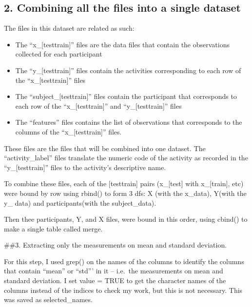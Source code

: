 \documentclass[
]{article}
\providecommand{\tightlist}{%
  \setlength{\itemsep}{0pt}\setlength{\parskip}{0pt}}
\begin{document}
\hypertarget{combining-all-the-files-into-a-single-dataset}{%
\subsection{2. Combining all the files into a single
dataset}\label{combining-all-the-files-into-a-single-dataset}}

The files in this dataset are related as such:

\begin{itemize}
\tightlist
\item
  The ``x\_{[}test\textbar train{]}'' files are the data files that
  contain the observations collected for each participant
\item
  The ``y\_{[}test\textbar train{]}'' files contain the activities
  corresponding to each row of the ``x\_{[}test\textbar train{]}'' files
\item
  The ``subject\_{[}test\textbar train{]}'' files contain the
  participant that corresponds to each row of the
  ``x\_{[}test\textbar train{]}'' and ``y\_{[}test\textbar train{]}''
  files
\item
  The ``features'' files contains the list of observations that
  corresponds to the columns of the ``x\_{[}test\textbar train{]}''
  files.
\end{itemize}

These files are the files that will be combined into one dataset. The
``activity\_label'' files translate the numeric code of the activity as
recorded in the ``y\_{[}test\textbar train{]}'' files to the activity's
descriptive name.

To combine these files, each of the {[}test\textbar train{]} pairs
(x\_{[}test{]} with x\_{[}train{]}, etc) were bound by row using rbind()
to form 3 dfs: X (with the x\_data), Y(with the y\_ data) and
participants(with the subject\_data).

Then thee participants, Y, and X files, were bound in this order, using
cbind() to make a single table called merge.

\#\#3. Extracting only the measurements on mean and standard deviation.

For this step, I used grep() on the names of the columns to identify the
columns that contain ``mean'' or ``std''' in it -- i.e.~the measurements
on mean and standard deviation. I set value = TRUE to get the character
names of the columns instead of the indices to check my work, but this
is not necessary. This was saved as selected\_names.
\end{document}
